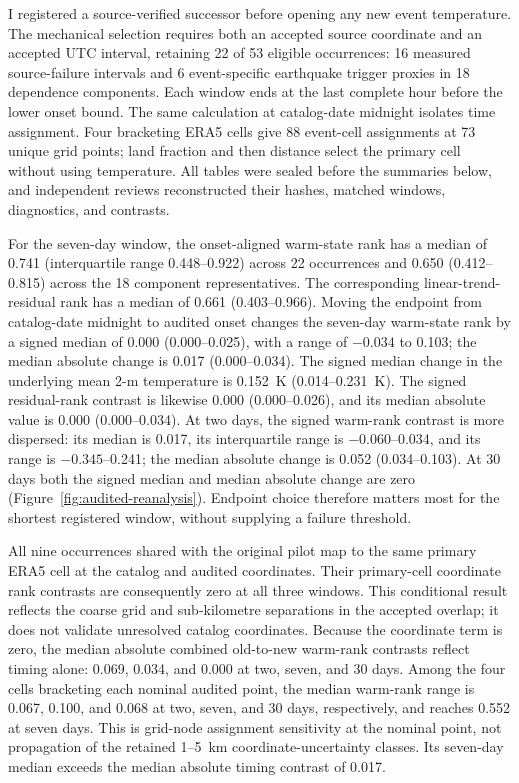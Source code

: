 \documentclass[11pt]{article}
\begin{document}
I registered a source-verified successor before opening any new event
temperature. The mechanical selection requires both an accepted source
coordinate and an accepted UTC interval, retaining 22 of 53 eligible
occurrences: 16 measured source-failure intervals and 6 event-specific
earthquake trigger proxies in 18 dependence components. Each window ends at
the last complete hour before the lower onset bound. The same calculation at
catalog-date midnight isolates time assignment. Four bracketing ERA5 cells
give 88 event-cell assignments at 73 unique grid points; land fraction and
then distance select the primary cell without using temperature. All tables
were sealed before the summaries below, and independent reviews reconstructed
their hashes, matched windows, diagnostics, and contrasts.

For the seven-day window, the onset-aligned warm-state rank has a median of
0.741 (interquartile range 0.448--0.922) across 22 occurrences and 0.650
(0.412--0.815) across the 18 component representatives. The corresponding
linear-trend-residual rank has a median of 0.661 (0.403--0.966). Moving the
endpoint from catalog-date midnight to audited onset changes the seven-day
warm-state rank by a signed median of 0.000 (0.000--0.025), with a range of
$-0.034$ to 0.103; the median absolute change is 0.017 (0.000--0.034). The
signed median change in the underlying mean 2-m temperature is 0.152~K
(0.014--0.231~K). The signed residual-rank contrast is likewise 0.000
(0.000--0.026), and its median absolute value is 0.000 (0.000--0.034). At two
days, the signed warm-rank contrast is more dispersed: its median is 0.017,
its interquartile range is $-0.060$--0.034, and its range is
$-0.345$--0.241; the median absolute change is 0.052 (0.034--0.103). At 30
days both the signed median and median absolute change are zero
(Figure~\ref{fig:audited-reanalysis}). Endpoint choice therefore matters most
for the shortest registered window, without supplying a failure threshold.

All nine occurrences shared with the original pilot map to the same primary
ERA5 cell at the catalog and audited coordinates. Their primary-cell
coordinate rank contrasts are consequently zero at all three windows. This
conditional result reflects the coarse grid and sub-kilometre separations in
the accepted overlap; it does not validate unresolved catalog coordinates.
Because the coordinate term is zero, the median absolute combined old-to-new
warm-rank contrasts reflect timing alone: 0.069, 0.034, and 0.000 at two,
seven, and 30 days.
Among the four cells bracketing each nominal audited point, the median
warm-rank range is 0.067, 0.100, and 0.068 at two, seven, and 30 days,
respectively, and reaches 0.552 at seven days. This is grid-node assignment
sensitivity at the nominal point, not propagation of the retained 1--5~km
coordinate-uncertainty classes. Its seven-day median exceeds the median
absolute timing contrast of 0.017.
\end{document}
